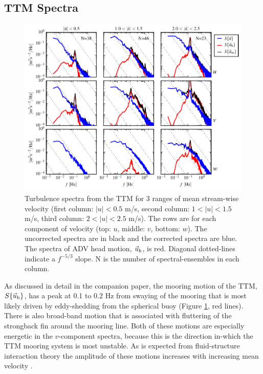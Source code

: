 \documentclass[twocol]{ametsoc}
\begin{document}
\subsection{TTM Spectra}

\begin{figure}[t]
  \centering
  \includegraphics{SpecFig02_TTM02B-top}
  \caption{Turbulence spectra from the TTM for 3 ranges of mean stream-wise velocity (first column: $|u|< 0.5$ m/s, second column: $1 < |u| < 1.5$ m/s, third column: $2 < |u| < 2.5$ m/s). The rows are for each component of velocity (top: $u$, middle: $v$, bottom: $w$). The uncorrected spectra are in black and the corrected spectra are blue. The spectra of ADV head motion, $\vec{u}_\mathrm{h}$, is red. Diagonal dotted-lines indicate a $f^{-5/3}$ slope. N is the number of spectral-ensembles in each column.}
  \label{fig:spec:ttm}
\end{figure}

As discussed in detail in the companion paper, the mooring motion of the TTM, $S\{\vec{u}_\mathrm{h}\}$, has a peak at 0.1 to 0.2 Hz from swaying of the mooring that is most likely driven by eddy-shedding from the spherical buoy (Figure \ref{fig:spec:ttm}, red lines). There is also broad-band motion that is associated with fluttering of the strongback fin around the mooring line. Both of these motions are especially energetic in the $v$-component spectra, because this is the direction in-which the TTM mooring system is most unstable. As is expected from fluid-structure interaction theory the amplitude of these motions increases with increasing mean velocity \cite[]{Morison++1950}.
\end{document}
